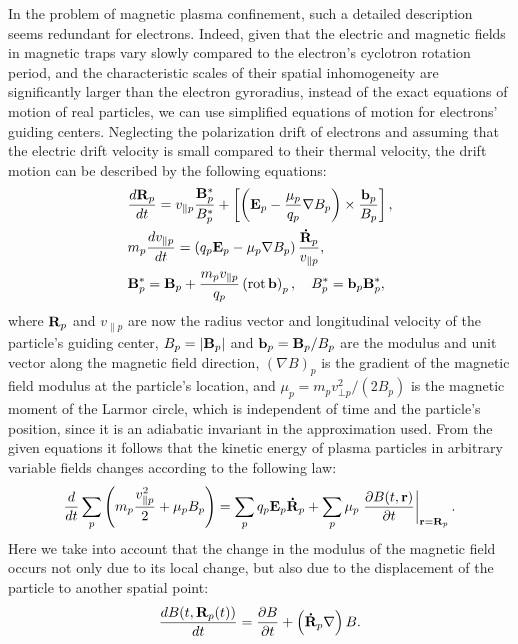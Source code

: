 \documentclass[final,3p]{elsarticle}
\newcommand{\rot}{\mbox{\rm{rot\,}}}
\begin{document}
In the problem of magnetic plasma confinement, such a detailed description seems redundant for electrons. Indeed, given that the electric and magnetic fields  in magnetic traps vary slowly compared to the electron's cyclotron rotation period, and the characteristic scales of their spatial inhomogeneity are significantly larger than the electron gyroradius, instead of the exact equations of motion of real particles, we can use simplified equations of motion for electrons' guiding centers. Neglecting the polarization drift of electrons and assuming that the electric drift velocity is small compared to their thermal velocity, the drift motion can be described by the following equations:
\begin{align}
	&\frac{d{\bf R}_p}{dt}=v_{\|p}\frac{{\bf B}_p^{\ast}}{B_p^{\ast}}+\left[\left({\bf E}_p-\frac{\mu_p}{q_p}\nabla B_p\right)\times \frac{{\bf b}_p}{B_p}\right], \\
	&m_p \frac{d v_{\|p}}{dt}=\left(q_p {\bf E}_p- \mu_p \nabla B_p\right)\frac{{\bf \dot{R}}_p}{v_{\|p}}, \\
	&{\bf B}_p^{\ast}={\bf B}_p +\frac{m_p v_{\|p}}{q_p} \left(\rot {\bf b}\right)_p, \quad B_p^{\ast}={\bf b}_p{\bf B}_p^{\ast},
\end{align}
where ${\bf R}_p$ and $v_{\|p}$ are now the radius vector and longitudinal velocity of the particle's guiding center, $B_p=|{\bf B}_p|$ and ${\bf b}_p={\bf B}_p/B_p$ are the modulus and unit vector along the magnetic field direction, $(\nabla B)_p$ is the gradient of the magnetic field modulus at the particle's location, and $\mu_p=m_p v_{\bot p}^2/(2B_p)$ is the magnetic moment of the Larmor circle, which is independent of time and the particle's position, since it is an adiabatic invariant in the approximation used. From the given equations it follows that the kinetic energy of plasma particles in arbitrary variable fields changes according to the following law:
\begin{equation}\label{kin}
	\frac{d}{dt}\sum\limits_p\left(m_p \frac{v_{\|p}^2}{2}+\mu_p B_p\right)=\sum\limits_p q_p {\bf E}_p {\bf \dot{R}}_p +\sum\limits_p\mu_p \left.\frac{\partial B(t,{\bf r})}{\partial t}\right|_{{\bf r}={\bf R}_p}.
\end{equation}
Here we take into account that the change in the modulus of the magnetic field occurs not only due to its local change, but also due to the displacement of the particle to another spatial point:
\begin{equation}
	\frac{dB(t,{\bf R}_p(t))}{dt}=\frac{\partial B}{\partial t}+\left({\bf \dot{R}}_p\nabla\right)B.
\end{equation}
\end{document}
